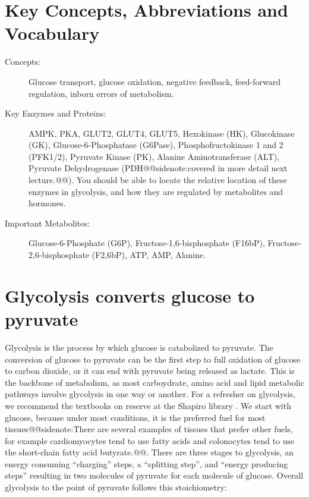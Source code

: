 \documentclass{tufte-handout}
\makeatletter
\def\sidenote#1{@@sidenote:#1@@}
\makeatother
\begin{document}
\section{Key Concepts, Abbreviations and Vocabulary}

\begin{description}
	\item[Concepts:] Glucose transport, glucose oxidation, negative feedback, feed-forward regulation, inborn errors of metabolism.  
	\item[Key Enzymes and Proteins:] AMPK, PKA, GLUT2, GLUT4, GLUT5, Hexokinase (HK), Glucokinase (GK), Glucose-6-Phosphatase (G6Pase), Phosphofructokinase 1 and 2 (PFK1/2), Pyruvate Kinase (PK), Alanine Aminotransferase (ALT), Pyruvate Dehydrogenase (PDH\sidenote{covered in more detail next lecture.}).  You should be able to locate the relative location of these enzymes in glycolysis, and how they are regulated by metabolites and hormones.
	\item[Important Metabolites:] Glucose-6-Phosphate (G6P), Fructose-1,6-bisphosphate (F16bP), Fructose-2,6-bisphosphate (F2,6bP), ATP, AMP, Alanine.

\end{description}

\pagebreak{}

\section{Glycolysis converts glucose to pyruvate}

Glycolysis is the process by which glucose is catabolized to pyruvate.  The conversion of glucose to pyruvate can be the first step to full oxidation of glucose to carbon dioxide, or it can end with pyruvate being released as lactate.  This is the backbone of metabolism, as most carboydrate, amino acid and lipid metabolic pathways involve glycolysis in one way or another.  For a refresher on glycolysis, we recommend the textbooks on reserve at the Shapiro library \citep{Berg2013,Ferrier2017}.  We start with glucose, because under most conditions, it is the preferred fuel for most tissues\sidenote{There are several examples of tissues that prefer other fuels, for example cardiomyocytes tend to use fatty acids and colonocytes tend to use the short-chain fatty acid butyrate.}.  There are three stages to glycolysis, an energy consuming ``charging'' steps, a ``splitting step'', and ``energy producing steps'' resulting in two molecules of pyruvate for each molecule of glucose.  Overall glycolysis to the point of pyruvate follows this stoichiometry:
\end{document}
